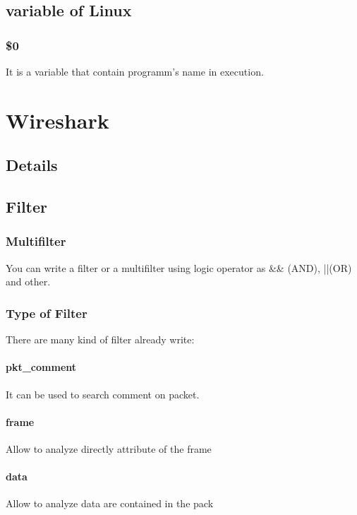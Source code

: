 \documentclass{article}
\begin{document}
    \subsection{variable of Linux}
                        \subsubsection{\$0}
                                It is a variable that contain programm's name in execution.
\section{Wireshark}
                \subsection{Details}
                \subsection{Filter}
                                \subsubsection{Multifilter} 
                                    You can write a filter or a multifilter using logic operator as \&\& (AND), ||(OR) and other.
                                \subsubsection{Type of Filter}
                                 There are many kind of filter already write:
                                    \paragraph{pkt\_comment}
                                    It can be used to search comment on packet.
                                    \paragraph{frame}
                                    Allow to analyze directly attribute of the frame
                                    \paragraph{data}
                                    Allow to analyze data  are contained in the pack
\end{document}
